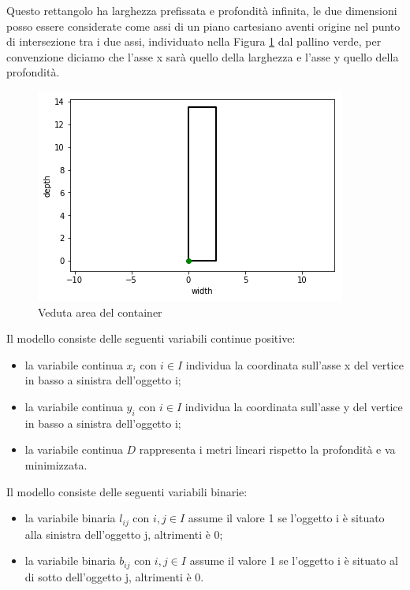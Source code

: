 Questo rettangolo ha larghezza prefissata e profondità infinita, le due dimensioni posso essere considerate come assi di un piano cartesiano aventi origine nel punto di intersezione tra i due assi, individuato nella Figura \ref{fig:veduta_aerea} dal pallino verde, per convenzione diciamo che l'asse x sarà quello della larghezza e l'asse y quello della profondità.
\begin{figure}[H]
	\begin{center} \includegraphics[scale=0.6]{figures/cartesian_wd}
		\caption[Veduta area - piano cartesiano]{Veduta area del container}  
		\label{fig:veduta_aerea}
	\end{center}
\end{figure}

\noindent Il modello consiste delle seguenti variabili continue positive:
\begin{itemize}
	\item la variabile continua $x_{i}$ con $i \in I$ individua la coordinata sull'asse x del vertice in basso a sinistra dell'oggetto i;
	\item la variabile continua $y_{i}$ con $i \in I$ individua la coordinata sull'asse y del vertice in basso a sinistra dell'oggetto i;
	\item la variabile continua $D$ rappresenta i metri lineari rispetto la profondità e va minimizzata.
\end{itemize}
Il modello consiste delle seguenti variabili binarie:
\begin{itemize}
	\item la variabile binaria $l_{ij}$ con $i,j \in I$ assume il valore 1 se l'oggetto i è situato alla sinistra dell'oggetto j, altrimenti è 0;
	\item la variabile binaria $b_{ij}$ con $i,j \in I$ assume il valore 1 se l'oggetto i è situato al di sotto dell'oggetto j, altrimenti è 0.
\end{itemize}

